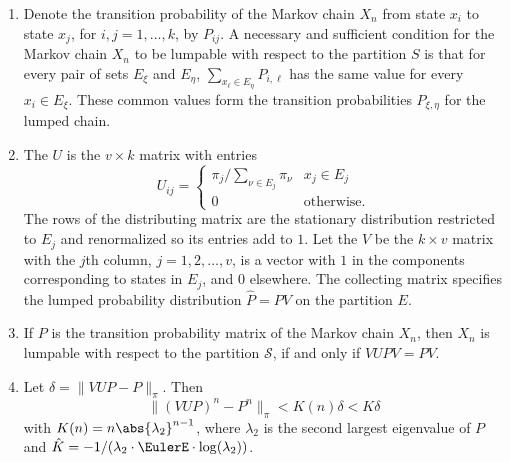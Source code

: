 \documentclass[12pt]{article}
\begin{document}
\begin{enumerate}
    \item
        Denote the transition probability of the Markov chain \( X_n \)
        from state \( x_i \) to state \( x_j \), for \( i, j = 1, \dots,
        k \), by \( P_{ij} \).  A necessary and sufficient condition for
        the Markov chain \( X_n \) to be lumpable with respect to the
        partition \( S \) is that for every pair of sets \( E_{\xi} \)
        and \( E_{\eta} \), \( \sum_{x_{\ell} \in E_{\eta}} P_{i,\ell}
        \) has the same value for every \( x_i \in E_{\xi} \).  These
        common values form the transition probabilities \( P_{\xi, \eta}
        \) for the lumped chain.
    \item
        The %
        \( U \) is the \( v \times k \) matrix with entries
        \[
            U_{ij} =
            \begin{cases}
                \pi_j/\sum_{\nu \in E_j} \pi_\nu & x_j \in E_j \\
                0 & \text{otherwise}.
            \end{cases}
        \] The rows of the distributing matrix are the stationary
        distribution restricted to \( E_j \) and renormalized so its
        entries add to \( 1 \). Let the %
        \( V \) be the \( k \times v \) matrix with the \( j \)th
        column, \( j = 1, 2, \dots, v \), is a vector with \( 1 \) in
        the components corresponding to states in \( E_j \), and \( 0 \)
        elsewhere.  The collecting matrix specifies the lumped
        probability distribution \( \hat{P} = P V \) on the partition \(
        E \).
    \item
        If \( P \) is the transition probability matrix of the Markov
        chain \( X_n \), then \( X_n \) is lumpable with respect to the
        partition \( \mathcal{S} \), if and only if \( VUPV = PV \).
    \item
        Let \( \delta = \| VUP - P \|_{\pi} \).  Then
        \[
            \| (VUP)^n - P^n \|_{\pi} < K(n) \delta < {K} \delta
        \] with \( K(n) = n \abs{\lambda_2}^{n-1} \), where \( \lambda_2
        \) is the second largest eigenvalue of \( P \) and \( \hat{K} =
        -1/(\lambda_2 \cdot \EulerE \cdot \log(\lambda_2)) \).
\end{enumerate}

\hr

\end{document}
